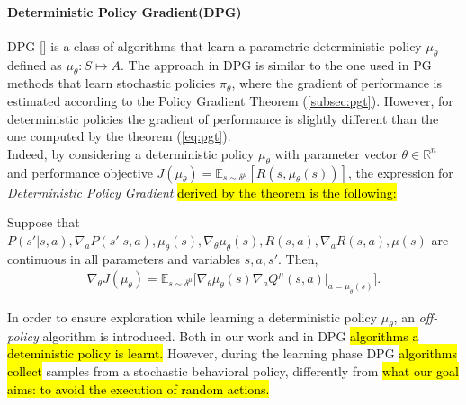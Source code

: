 \paragraph{Deterministic Policy Gradient(DPG)} \label{subsec:dpg}
\ac{DPG} [\cite{article}] is a class of algorithms that learn a parametric deterministic policy $\mu_{\theta}$ defined as $\mu_{\theta}: S \mapsto A$. The approach in \ac{DPG} is similar to the one used in \ac{PG} methods that learn stochastic policies $\pi_{\theta}$, where the gradient of performance is estimated according to the Policy Gradient Theorem (\ref{subsec:pgt}). However, for deterministic policies the gradient of performance is slightly different than the one computed by the theorem (\ref{eq:pgt}).\\
\newline
Indeed, by considering a deterministic policy $\mu_{\theta}$ with parameter vector $\theta \in \mathbb{R}^n$ and performance objective $J(\mu_{\theta}) = \mathbb{E}_{s \sim \delta^{\mu}}[R(s, \mu_{\theta}(s))]$, the expression for \emph{Deterministic Policy Gradient} \hl{derived by the theorem is the following:}
\begin{theorem} \label{th:dpgt}
	Suppose that $P(s'|s,a), \nabla_aP(s'|s,a), \mu_{\theta}(s), \nabla_{\theta} \mu_{\theta}(s), R(s,a), \nabla_a R(s,a), \mu(s)$  are continuous in all parameters and variables $s, a, s'$. Then, 
	\begin{align}
	\nabla_{\theta}J(\mu_{\theta}) = \mathbb{E}_{s \sim \delta^{\mu}} \Big[\nabla_{\theta} \mu_{\theta} (s) \nabla_a Q^{\mu}(s,a)|_{a = \mu_{\theta} (s)}\Big].
	\end{align}
\end{theorem}
\noindent In order to ensure exploration while learning a deterministic policy $\mu_{\theta}$, an \emph{off-policy} algorithm is introduced. %
Both in our work and in \ac{DPG} \hl{algorithms a deteministic policy is learnt.} However, during the learning phase \ac{DPG} \hl{algorithms collect} samples from a stochastic behavioral policy, differently from \hl{what our goal aims: to avoid the execution of random actions.}\\
